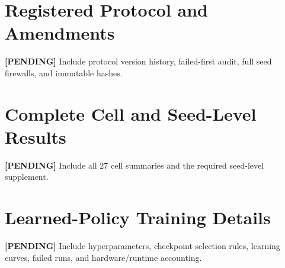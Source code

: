 \documentclass{article}
\newcommand{\pending}[1]{\textcolor{red!70!black}{\textbf{[PENDING]} #1}}
\begin{document}



\appendix
\section{Registered Protocol and Amendments}
\pending{Include protocol version history, failed-first audit, full seed
firewalls, and immutable hashes.}

\section{Complete Cell and Seed-Level Results}
\pending{Include all 27 cell summaries and the required seed-level supplement.}

\section{Learned-Policy Training Details}
\pending{Include hyperparameters, checkpoint selection rules, learning curves,
failed runs, and hardware/runtime accounting.}
\end{document}
